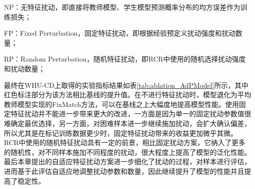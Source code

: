 \documentclass[lang=chs, degree=master, blindreview=false, adobe=false]{yanputhesis}
\begin{document}
NP：无特征扰动，即直接将教师模型、学生模型预测概率分布的均方误差作为训练损失；

FP：Fixed Perturbation，固定特征扰动，即根据经验预定义扰动强度和扰动数量；

RP：Random Perturbation，随机特征扰动，即RCR中使用的随机选择扰动强度和扰动数量；

最终在WHU-CD上取得的实验指标结果如表\ref{tab:ablation_AdPModel}所示，其中红色标注部分为该方法相比基线的提升值。在不进行特征扰动时，模型退化为平均教师模型实现的FixMatch方法，可以在基线之上大幅度地提高模型性能。使用固定特征扰动并不能进一步带来更大的改进，一方面是因为单一的固定扰动参数值很难确定最优选择，另一方面，对困难样本进一步继续施加扰动，会扩大确认偏差，所以尤其是在标记训练数据更少时，固定特征扰动带来的收益更加微乎其微。RCR中使用的随机特征扰动具有一定的前景，相比固定扰动方案，它纳入了更多的随机性，对不同样本施加不同程度的扰动，很大程度上提高了模型的泛化性能。最后本章提出的自适应特征扰动方案进一步细化了扰动的过程，对样本进行评估，进而基于此评估自适应地调整扰动参数和数量，因此继续提升了模型的性能并且提高了稳定性。
\end{document}

